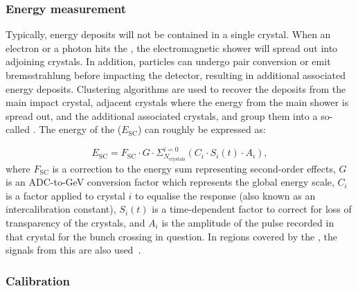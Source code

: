 \subsubsection{Energy measurement}
\label{sec:cms:ecal:energymeasurement}

Typically, energy deposits will not be contained in a single crystal. When an electron or a photon hits the \ECAL, the electromagnetic shower will spread out into adjoining crystals. In addition, particles can undergo pair conversion or emit bremsstrahlung before impacting the detector, resulting in additional associated energy deposits.
Clustering algorithms are used to recover the deposits from the main impact crystal, adjacent crystals where the energy from the main shower is spread out, and the additional associated crystals, and group them into a so-called \SC. %
The energy of the \SC ($E_{\textrm{SC}}$) can roughly be expressed as: 

\begin{equation} 
\label{eq:cms:ecal:energy}
E_{\text{SC}} = F_{\text{SC}} \cdot G \cdot \Sigma^{i=0}_{N_\text{crystals}} ( C_{i} \cdot S_{i}(t) \cdot A_{i}) ,
\end{equation}
where $F_{\text{SC}}$ is a correction to the \SC energy sum representing second-order effects, $G$ is an ADC-to-GeV conversion factor which represents the global energy scale, $C_{i}$ is a factor applied to crystal $i$ to equalise the response (also known as an intercalibration constant), $S_{i}(t)$ is a time-dependent factor to correct for loss of transparency of the crystals, and $A_{i}$ is the amplitude of the pulse recorded in that crystal for the bunch crossing in question. In regions covered by the \ES, the signals from this \subdetector are also used~\cite{cmsEcalCalibration}.


\subsubsection{Calibration}
\label{sec:cms:ecal:calibration}

